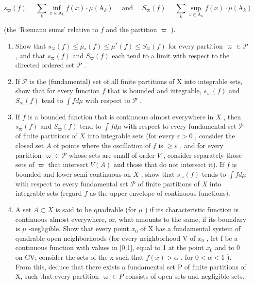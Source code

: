 \[
s _ {\varpi} (f) = \sum_ {k} \inf _ {x \in \mathrm{A} _ {k}} f (x) \cdot \mu (\mathrm{A} _ {k}) \quad \text { and } \quad S _ {\varpi} (f) = \sum_ {k} \sup _ {x \in \mathrm{A} _ {k}} f (x) \cdot \mu (\mathrm{A} _ {k})
\]

(the `Riemann sums' relative to \(f\) and the partition \(\varpi\) ).

\begin{enumerate}
\def\labelenumi{\alph{enumi})}
\item
  Show that \(s_{\varpi}(f) \leqslant \mu_{*}(f) \leqslant \mu^{*}(f) \leqslant S_{\varpi}(f)\) for every partition \(\varpi \in \mathcal{P}\) , and that \(s_{\varpi}(f)\) and \(S_{\varpi}(f)\) each tend to a limit with respect to the directed ordered set \(\mathcal{P}\) .
\item
  If \(\mathcal{P}\) is the (fundamental) set of all finite partitions of X into integrable sets, show that for every function \(f\) that is bounded and integrable, \(s_{\varpi}(f)\) and \(S_{\varpi}(f)\) tend to \(\int f d\mu\) with respect to \(\mathcal{P}\) .
\item
  If \(f\) is a bounded function that is continuous almost everywhere in \(X\) , then \(s_{\varpi}(f)\) and \(S_{\varpi}(f)\) tend to \(\int f d\mu\) with respect to every fundamental set \(\mathcal{P}\) of finite partitions of \(X\) into integrable sets (for every \(\varepsilon > 0\) , consider the closed set \(A\) of points where the oscillation of \(f\) is \(\geqslant \varepsilon\) , and for every partition \(\varpi \in \mathcal{P}\) whose sets are small of order \(V\) , consider separately those sets of \(\varpi\) that intersect \(V(A)\) and those that do not intersect it). If \(f\) is bounded and lower semi-continuous on \(X\) , show that \(s_{\varpi}(f)\) tends to \(\int f d\mu\) with respect to every fundamental set \(\mathcal{P}\) of finite partitions of \(X\) into integrable sets (regard \(f\) as the upper envelope of continuous functions).
\item
  A set \(A \subset X\) is said to be quadrable (for \(\mu\) ) if its characteristic function is continuous almost everywhere, or, what amounts to the same, if its boundary is \(\mu\) -negligible. Show that every point \(x_{0}\) of X has a fundamental system of quadrable open neighborhoods (for every neighborhood V of \(x_{0}\) , let f be a continuous function with values in {[}0,1{]}, equal to 1 at the point \(x_{0}\) and to 0 on CV; consider the sets of the x such that \(f(x) > \alpha\) , for \(0 < \alpha < 1\) ). From this, deduce that there exists a fundamental set P of finite partitions of X, such that every partition \(\varpi \in P\) consists of open sets and negligible sets.

\end{enumerate}

